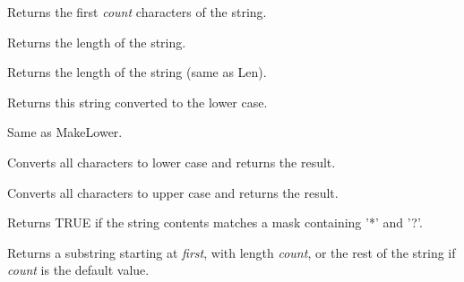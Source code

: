 \label{wxstringleft}


Returns the first {\it count} characters of the string.

\label{wxstringlen}


Returns the length of the string.

\label{wxstringlength}


Returns the length of the string (same as Len).

\label{wxstringlower}


Returns this string converted to the lower case.

\label{wxstringlowercase}


Same as MakeLower.

\label{wxstringmakelower}


Converts all characters to lower case and returns the result.

\label{wxstringmakeupper}


Converts all characters to upper case and returns the result.

\label{wxstringmatches}


Returns TRUE if the string contents matches a mask containing '*' and '?'.

\label{wxstringmid}


Returns a substring starting at {\it first}, with length {\it count}, or the rest of
the string if {\it count} is the default value.

\label{wxstringpad}

